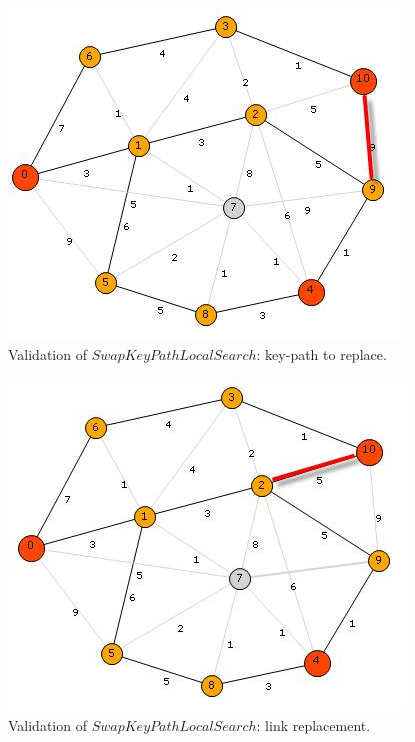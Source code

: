 \begin{figure}[H]
\begin{center}
\includegraphics[scale=0.9]{32.jpg}
\caption{Validation of $SwapKeyPathLocalSearch$: key-path to replace.}\label{fig:32}
\end{center} 
\end{figure}

\begin{figure}[H]
\begin{center}
\includegraphics[scale=0.9]{33.jpg}
\caption{Validation of $SwapKeyPathLocalSearch$: link replacement.}\label{fig:33}
\end{center} 
\end{figure}

